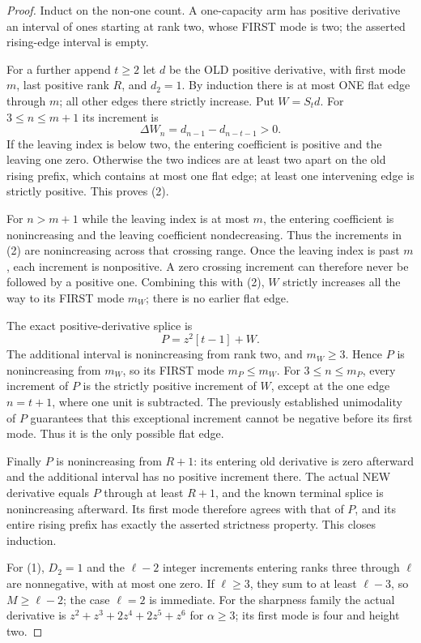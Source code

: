 \begin{proof}
Induct on the non-one count. A one-capacity arm has positive derivative
an interval of ones starting at rank two, whose FIRST mode is two;
the asserted rising-edge interval is empty.

For a further append $t\ge2$ let $d$ be the OLD positive derivative,
with first mode $m$, last positive rank $R$, and $d_2=1$.
By induction there is at most ONE flat edge through $m$; all other
edges there strictly increase. Put $W=S_td$.
For $3\le n\le m+1$ its increment is
\[
                         \Delta W_n=d_{n-1}-d_{n-t-1}>0. \tag{2}
\]
If the leaving index is below two, the entering coefficient is positive
and the leaving one zero. Otherwise the two indices are at least two
apart on the old rising prefix, which contains at most one flat edge;
at least one intervening edge is strictly positive. This proves (2).

For $n>m+1$ while the leaving index is at most $m$, the entering
coefficient is nonincreasing and the leaving coefficient nondecreasing.
Thus the increments in (2) are nonincreasing across that crossing
range. Once the leaving index is past $m$, each increment is nonpositive.
A zero crossing increment can therefore never be followed by a positive
one. Combining this with (2), $W$ strictly increases all the way to its
FIRST mode $m_W$; there is no earlier flat edge.

The exact positive-derivative splice is
\[
                          P=z^2[t-1]+W.
\]
The additional interval is nonincreasing from rank two, and $m_W\ge3$.
Hence $P$ is nonincreasing from $m_W$, so its FIRST mode $m_P\le m_W$.
For $3\le n\le m_P$, every increment of $P$ is the strictly positive
increment of $W$, except at the one edge $n=t+1$, where one unit is
subtracted. The previously established unimodality of $P$ guarantees
that this exceptional increment cannot be negative before its first mode.
Thus it is the only possible flat edge.

Finally $P$ is nonincreasing from $R+1$: its entering old derivative
is zero afterward and the additional interval has no positive increment
there. The actual NEW derivative equals $P$ through at least $R+1$,
and the known terminal splice is nonincreasing afterward. Its first
mode therefore agrees with that of $P$, and its entire rising prefix
has exactly the asserted strictness property. This closes induction.

For (1), $D_2=1$ and the $\ell-2$ integer increments entering ranks
three through $\ell$ are nonnegative, with at most one zero.
If $\ell\ge3$, they sum to at least $\ell-3$, so $M\ge\ell-2$;
the case $\ell=2$ is immediate. For the sharpness family the actual
derivative is $z^2+z^3+2z^4+2z^5+z^6$ for $\alpha\ge3$;
its first mode is four and height two.
\end{proof}

